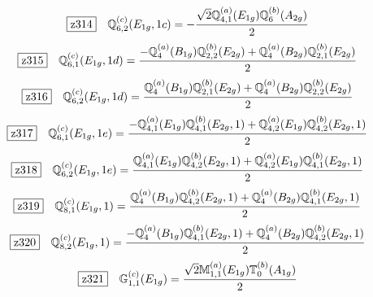 \documentclass[fleqn,10pt,landscape]{jsarticle}
\begin{document}
\begin{dmath*}
\hspace*{3mm}\fbox{z314}\quad \mathbb{Q}_{6,2}^{(c)}(E_{1g},1c)=- \frac{\sqrt{2} \mathbb{Q}_{4,1}^{(a)}(E_{1g}) \mathbb{Q}_{6}^{(b)}(A_{2g})}{2}
\end{dmath*}
\begin{dmath*}
\hspace*{3mm}\fbox{z315}\quad \mathbb{Q}_{6,1}^{(c)}(E_{1g},1d)=\frac{- \mathbb{Q}_{4}^{(a)}(B_{1g}) \mathbb{Q}_{2,2}^{(b)}(E_{2g}) + \mathbb{Q}_{4}^{(a)}(B_{2g}) \mathbb{Q}_{2,1}^{(b)}(E_{2g})}{2}
\end{dmath*}
\begin{dmath*}
\hspace*{3mm}\fbox{z316}\quad \mathbb{Q}_{6,2}^{(c)}(E_{1g},1d)=\frac{\mathbb{Q}_{4}^{(a)}(B_{1g}) \mathbb{Q}_{2,1}^{(b)}(E_{2g}) + \mathbb{Q}_{4}^{(a)}(B_{2g}) \mathbb{Q}_{2,2}^{(b)}(E_{2g})}{2}
\end{dmath*}
\begin{dmath*}
\hspace*{3mm}\fbox{z317}\quad \mathbb{Q}_{6,1}^{(c)}(E_{1g},1e)=\frac{- \mathbb{Q}_{4,1}^{(a)}(E_{1g}) \mathbb{Q}_{4,1}^{(b)}(E_{2g},1) + \mathbb{Q}_{4,2}^{(a)}(E_{1g}) \mathbb{Q}_{4,2}^{(b)}(E_{2g},1)}{2}
\end{dmath*}
\begin{dmath*}
\hspace*{3mm}\fbox{z318}\quad \mathbb{Q}_{6,2}^{(c)}(E_{1g},1e)=\frac{\mathbb{Q}_{4,1}^{(a)}(E_{1g}) \mathbb{Q}_{4,2}^{(b)}(E_{2g},1) + \mathbb{Q}_{4,2}^{(a)}(E_{1g}) \mathbb{Q}_{4,1}^{(b)}(E_{2g},1)}{2}
\end{dmath*}
\begin{dmath*}
\hspace*{3mm}\fbox{z319}\quad \mathbb{Q}_{8,1}^{(c)}(E_{1g},1)=\frac{\mathbb{Q}_{4}^{(a)}(B_{1g}) \mathbb{Q}_{4,2}^{(b)}(E_{2g},1) + \mathbb{Q}_{4}^{(a)}(B_{2g}) \mathbb{Q}_{4,1}^{(b)}(E_{2g},1)}{2}
\end{dmath*}
\begin{dmath*}
\hspace*{3mm}\fbox{z320}\quad \mathbb{Q}_{8,2}^{(c)}(E_{1g},1)=\frac{- \mathbb{Q}_{4}^{(a)}(B_{1g}) \mathbb{Q}_{4,1}^{(b)}(E_{2g},1) + \mathbb{Q}_{4}^{(a)}(B_{2g}) \mathbb{Q}_{4,2}^{(b)}(E_{2g},1)}{2}
\end{dmath*}
\begin{dmath*}
\hspace*{3mm}\fbox{z321}\quad \mathbb{G}_{1,1}^{(c)}(E_{1g})=\frac{\sqrt{2} \mathbb{M}_{1,1}^{(a)}(E_{1g}) \mathbb{T}_{0}^{(b)}(A_{1g})}{2}
\end{dmath*}
\end{document}
